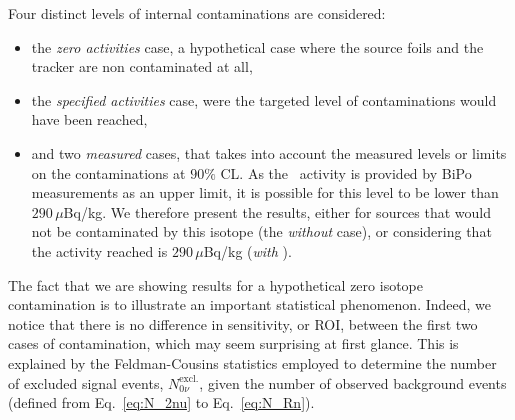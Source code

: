 Four distinct levels of internal contaminations are considered:
\begin{itemize}
\item the \emph{zero activities} case, a hypothetical case where the source foils and the tracker are non contaminated at all,
\item the \emph{specified activities} case, were the targeted level of contaminations would have been reached,
\item and two \emph{measured} cases,  that takes into account the measured levels or limits on the contaminations at $90\%$ CL.
  As the \Bi\ activity is provided by BiPo measurements as an upper limit, it is possible for this level to be lower than $290\,\mu$Bq/kg.
  We therefore present the results, either for sources that would not be contaminated by this isotope (the \emph{without \Bi} case), or considering that the activity reached is $290\,\mu$Bq/kg (\emph{with \Bi}).
\end{itemize}
The fact that we are showing results for a hypothetical zero isotope contamination is to illustrate an important statistical phenomenon.
Indeed, we notice that there is no difference in sensitivity, or ROI, between the first two cases of contamination, which may seem surprising at first glance. %
This is explained by the Feldman-Cousins statistics employed to determine the number of excluded signal events, $N_{0\nu}^{\text{excl.}}$, given the number of observed background events (defined from Eq.~\eqref{eq:N_2nu} to Eq.~\eqref{eq:N_Rn}).

